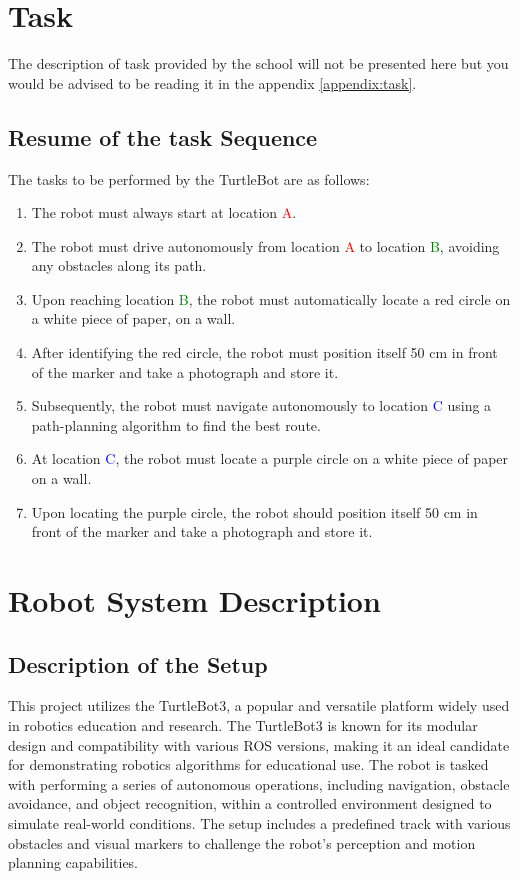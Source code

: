 \documentclass{article}
\begin{document}
	\section{Task}
	The description of task provided by the school will not be presented here but you would be advised to be reading it in the appendix \ref*{appendix:task}.
	
	\subsection{Resume of the task Sequence}
	The tasks to be performed by the TurtleBot are as follows:
	\begin{enumerate}
		\item The robot must always start at location \textcolor{red}{A}.
		\item The robot must drive autonomously from location \textcolor{red}{A} to location \textcolor{green}{B}, avoiding any obstacles along its path.
		\item Upon reaching location \textcolor{green}{B}, the robot must automatically locate a red circle on a white piece of paper, on a wall.
		\item After identifying the red circle, the robot must position itself 50 cm in front of the marker and take a photograph and store it.
		\item Subsequently, the robot must navigate autonomously to location \textcolor{blue}{C} using a path-planning algorithm to find the best route.
		\item At location \textcolor{blue}{C}, the robot must locate a purple circle on a white piece of paper on a wall.
		\item Upon locating the purple circle, the robot should position itself 50 cm in front of the marker and take a photograph and store it.
	\end{enumerate}

	\section{Robot System Description}
	\subsection{Description of the Setup}
	This project utilizes the TurtleBot3, a popular and versatile platform widely used in robotics education and research. The TurtleBot3 is known for its modular design and compatibility with various ROS versions, making it an ideal candidate for demonstrating robotics algorithms for educational use. The robot is tasked with performing a series of autonomous operations, including navigation, obstacle avoidance, and object recognition, within a controlled environment designed to simulate real-world conditions. The setup includes a predefined track with various obstacles and visual markers to challenge the robot's perception and motion planning capabilities.
	
\end{document}
